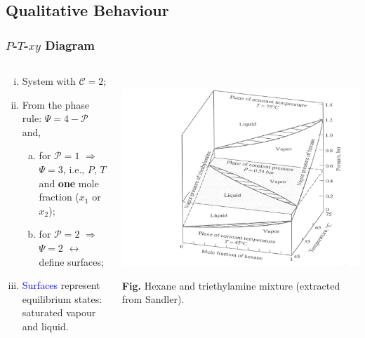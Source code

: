 \documentclass[10pt,compress,unknownkeysallowed]{beamer}
\begin{document}
\subsection{Qualitative Behaviour}
\begin{frame}
  \frametitle{$P$-$T$-$xy$ Diagram}
  \begin{columns}
     \begin{column}[l]{0.35\linewidth}
        \begin{enumerate}[i)]
            \item<1-> System with $\mathcal{C} =2$;
            \item<2-> From the phase rule: $\Psi = 4 -\mathcal{P}$ and,
                \begin{enumerate}[a)]
                    \item<3-> for $\mathcal{P}=1$ $\Longrightarrow$ $\Psi=3$, i.e., $P$, $T$ and {\bf one} mole fraction (\ie $x_{1}$ or $x_{2}$);
                    \item<4-> for $\mathcal{P}=2$ $\Longrightarrow$ $\Psi=2$ $\leftrightarrow$ define surfaces;
                \end{enumerate}
            \item<5-> \textcolor{blue}{Surfaces} represent equilibrium states: saturated vapour and liquid.
        \end{enumerate}
     \end{column}
     \begin{column}[l]{0.65\linewidth}
       \hbox{
          \hspace{-.9cm}\includegraphics[width=9.cm,clip]{./../Pics/PTxy_diagram}}
       \begin{center}
            \tiny{{\bf Fig.} Hexane and triethylamine mixture (extracted from Sandler).}
            \end{center}
     \end{column} 
  \end{columns}
\end{frame}
\normalsize
\end{document}
